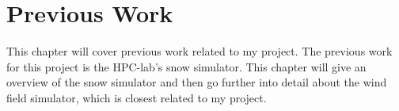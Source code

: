 \chapter{Previous Work}

This chapter will cover previous work related to my project. The previous work for 
this project is the HPC-lab's snow simulator. This chapter will give an overview 
of the snow simulator and then go further into detail about the wind field simulator, 
which is closest related to my project. 


